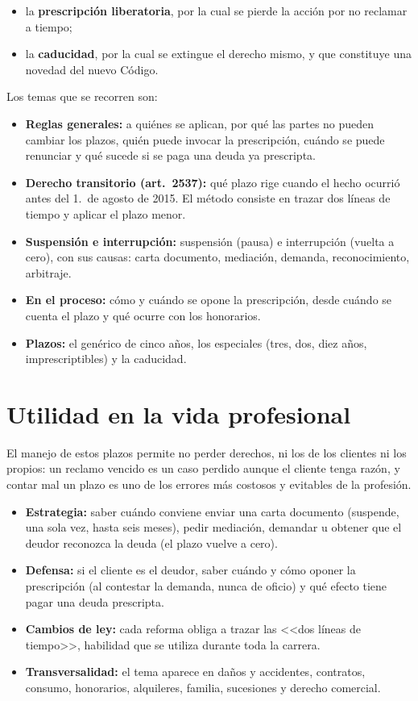 \documentclass[12pt,oneside]{book}
\begin{document}
\begin{itemize}
  \item la \textbf{prescripci\'on liberatoria}, por la cual se pierde la acci\'on por no reclamar a tiempo;
  \item la \textbf{caducidad}, por la cual se extingue el derecho mismo, y que constituye una novedad del nuevo C\'odigo.
\end{itemize}

Los temas que se recorren son:

\begin{itemize}
  \item \textbf{Reglas generales:} a qui\'enes se aplican, por qu\'e las partes no pueden cambiar los plazos, qui\'en puede invocar la prescripci\'on, cu\'ando se puede renunciar y qu\'e sucede si se paga una deuda ya prescripta.
  \item \textbf{Derecho transitorio (art.\ 2537):} qu\'e plazo rige cuando el hecho ocurri\'o antes del 1.\textordmasculine\ de agosto de 2015. El m\'etodo consiste en trazar dos l\'ineas de tiempo y aplicar el plazo menor.
  \item \textbf{Suspensi\'on e interrupci\'on:} suspensi\'on (pausa) e interrupci\'on (vuelta a cero), con sus causas: carta documento, mediaci\'on, demanda, reconocimiento, arbitraje.
  \item \textbf{En el proceso:} c\'omo y cu\'ando se opone la prescripci\'on, desde cu\'ando se cuenta el plazo y qu\'e ocurre con los honorarios.
  \item \textbf{Plazos:} el gen\'erico de cinco a\~nos, los especiales (tres, dos, diez a\~nos, imprescriptibles) y la caducidad.
\end{itemize}

\section{Utilidad en la vida profesional}

El manejo de estos plazos permite no perder derechos, ni los de los clientes ni los propios: un reclamo vencido es un caso perdido aunque el cliente tenga raz\'on, y contar mal un plazo es uno de los errores m\'as costosos y evitables de la profesi\'on.

\begin{itemize}
  \item \textbf{Estrategia:} saber cu\'ando conviene enviar una carta documento (suspende, una sola vez, hasta seis meses), pedir mediaci\'on, demandar u obtener que el deudor reconozca la deuda (el plazo vuelve a cero).
  \item \textbf{Defensa:} si el cliente es el deudor, saber cu\'ando y c\'omo oponer la prescripci\'on (al contestar la demanda, nunca de oficio) y qu\'e efecto tiene pagar una deuda prescripta.
  \item \textbf{Cambios de ley:} cada reforma obliga a trazar las <<dos l\'ineas de tiempo>>, habilidad que se utiliza durante toda la carrera.
  \item \textbf{Transversalidad:} el tema aparece en da\~nos y accidentes, contratos, consumo, honorarios, alquileres, familia, sucesiones y derecho comercial.
\end{itemize}
\end{document}
